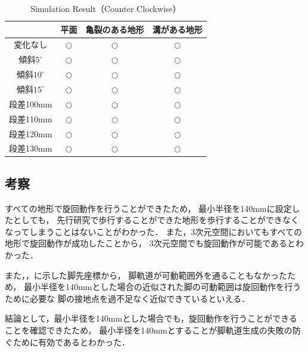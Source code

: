 \begin{table}[htbp]
  \centering
  \caption{Simulation Result（Counter Clockwise）}
  \label{tab:ch5_simu_result_turn}  %
  \begin{tabular}{|c|c|c|c|} \hline  %
    & 平面 & 亀裂のある地形 & 溝がある地形 \\ \hline  %
    変化なし & $\bigcirc$ & $\bigcirc$ & $\bigcirc$ \\ \hline  %
    傾斜$5^{\circ}$ & $\bigcirc$ & $\bigcirc$ & $\bigcirc$ \\ \hline  %
    傾斜$10^{\circ}$ & $\bigcirc$ & $\bigcirc$ & $\bigcirc$ \\ \hline  %
    傾斜$15^{\circ}$ & $\bigcirc$ & $\bigcirc$ & $\bigcirc$ \\ \hline  %
    段差100mm & $\bigcirc$ & $\bigcirc$ & $\bigcirc$ \\ \hline  %
    段差110mm & $\bigcirc$ & $\bigcirc$ & $\bigcirc$ \\ \hline  %
    段差120mm & $\bigcirc$ & $\bigcirc$ & $\bigcirc$ \\ \hline  %
    段差130mm & $\bigcirc$ & $\bigcirc$ & $\bigcirc$ \\ \hline  %
  \end{tabular}
\end{table}



\subsection{考察}
すべての地形で旋回動作を行うことができたため，
最小半径を140mmに設定したとしても，
先行研究で歩行することができた地形を歩行することができなくなってしまうことはないことがわかった．
また，3次元空間においてもすべての地形で旋回動作が成功したことから，
3次元空間でも旋回動作が可能であるとわかった．

また，，に示した脚先座標から，
脚軌道が可動範囲外を通ることもなかったため，
最小半径を140mmとした場合の近似された脚の可動範囲は旋回動作を行うために必要な
脚の接地点を過不足なく近似できているといえる．

結論として，最小半径を140mmとした場合でも，旋回動作を行うことができることを確認できたため，
最小半径を140mmとすることが脚軌道生成の失敗の防ぐために有効であるとわかった．

\newpage

